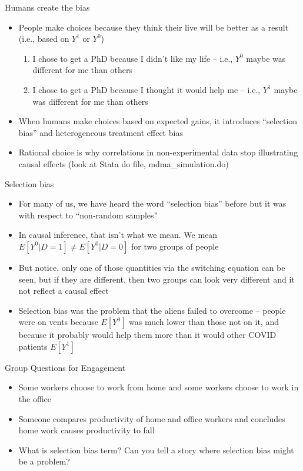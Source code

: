 \documentclass{beamer}
\begin{document}
\begin{frame}{Humans create the bias}

\begin{itemize}
\item People make choices because they think their live will be better as a result (i.e., based on $Y^1$ or $Y^0$) 
	\begin{enumerate}
	\item I chose to get a PhD because I didn't like my life -- i.e., $Y^0$ maybe was different for me than others
	\item I chose to get a PhD because I thought it would help me -- i.e., $Y^1$ maybe was different for me than others
	\end{enumerate}
\item When humans make choices based on expected gains, it introduces ``selection bias'' and heterogeneous treatment effect bias 
\item Rational choice is why correlations in non-experimental data stop illustrating causal effects (look at Stata do file, mdma\_simulation.do)
\end{itemize}

\end{frame}


\begin{frame}{Selection bias}

\begin{itemize}
\item For many of us, we have heard the word ``selection bias'' before but it was with respect to ``non-random samples''
\item In causal inference, that isn't what we mean.  We mean $E[Y^0|D=1] \neq E[Y^0 |D=0]$ for two groups of people
\item But notice, only one of those quantities via the switching equation can be seen, but if they are different, then two groups can look very different and it not reflect a causal effect
\item Selection bias was the problem that the aliens failed to overcome -- people were on vents because $E[Y^0]$ was much lower than those not on it, and because it probably would help them more than it would other COVID patients $E[Y^1]$
\end{itemize}

\end{frame}


\begin{frame}{Group Questions for Engagement}

\begin{itemize}
\item Some workers choose to work from home and some workers choose to work in the office
\item Someone compares productivity of home and office workers and concludes home work causes productivity to fall
\item What is selection bias term? Can you tell a story where selection bias might be a problem?
\end{itemize}

\end{frame}
\end{document}
